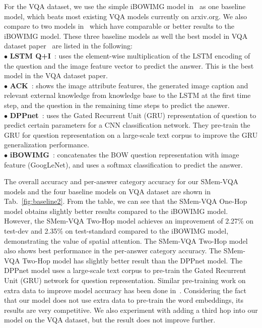 For the VQA dataset, we use the simple iBOWIMG model in~\cite{zhou2015simple} as one baseline model, which beats most existing VQA models currently on arxiv.org. We also compare to two models in~\cite{wu2015ask}\cite{noh2015image} which have comparable or better results to the iBOWIMG model. These three baseline models as well the best model in VQA dataset paper~\cite{DBLP:journals/corr/AntolALMBZP15} are listed in the following:\\
{$\bullet$} {\bf{LSTM Q+I}}~\cite{DBLP:journals/corr/AntolALMBZP15}: uses the element-wise multiplication of the LSTM encoding of the question and the image feature vector to predict the answer. This is the best model in the VQA dataset paper.\\
{$\bullet$} {\bf{ACK}}~\cite{wu2015ask}: shows the image attribute features, the generated image caption and relevant external knowledge from knowledge base to the LSTM at the first time step, and the question in the remaining time steps to predict the answer.\\
{$\bullet$} {\bf{DPPnet}}~\cite{noh2015image}: uses the Gated Recurrent Unit (GRU) representation of question to predict certain parameters for a CNN classification network. They pre-train the GRU for question representation on a large-scale text corpus to improve the GRU generalization performance.\\
{$\bullet$} {\bf{iBOWIMG}}~\cite{zhou2015simple}: concatenates the BOW question representation with image feature (GoogLeNet), and uses a softmax classification to predict the answer. 

The overall accuracy and per-answer category accuracy for our SMem-VQA models and the four baseline models on VQA dataset are shown in Tab.~\ref{fig:baseline2}. From the table, we can see that the SMem-VQA One-Hop model obtains slightly better results compared to the iBOWIMG model. However, the SMem-VQA Two-Hop model achieves an improvement of 2.27\% on test-dev and 2.35\% on test-standard compared to the iBOWIMG model, demonstrating the value of spatial attention. The SMem-VQA Two-Hop model also shows best performance in the per-answer category accuracy. 
The SMem-VQA Two-Hop model has slightly better result than the DPPnet model. 
The DPPnet model uses a large-scale text corpus to pre-train the Gated Recurrent Unit (GRU) network for question representation.
Similar pre-training work on extra data to improve model accuracy has been done in~\cite{venugopalan2014translating}.
Considering the fact that our model does not use extra data to pre-train the word embeddings, its results are very competitive.
We also experiment with adding a third hop into our model on the VQA dataset, but the result does not improve further.

